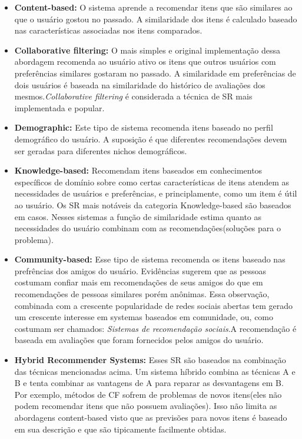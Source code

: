 \begin{itemize}
  \item \textbf{Content-based:} O sistema aprende a recomendar itens que são similares ao que o usuário gostou no passado. A similaridade dos itens é calculado baseado nas características associadas nos itens comparados.
  \item \textbf{Collaborative filtering:} O mais simples e original implementação dessa abordagem recomenda ao usuário ativo os itens que outros usuários com preferências similares gostaram no passado. A similaridade em preferências de dois usuários é baseada na similaridade do histórico de avaliações dos mesmos.\emph{Collaborative filtering} é considerada a técnica de SR mais implementada e popular.
  \item \textbf{Demographic:} Este tipo de sistema recomenda itens baseado no perfil demográfico do usuário. A suposição é que diferentes recomendações devem ser geradas para diferentes nichos demográficos.
  \item \textbf{Knowledge-based:} Recomendam itens baseados em conhecimentos específicos de domínio sobre como certas características de itens atendem as necessidades de usuários e preferências, e principlamente, como um item é útil ao usuário. Os SR mais notáveis da categoria Knowledge-based são baseados em casos. Nesses sistemas a função de similaridade estima quanto as necessidades do usuário combinam com as recomendações(soluções para o problema).
  \item \textbf{Community-based:} Esse tipo de sistema recomenda os itens baseado nas prefrências dos amigos do usuário. Evidências sugerem que as pessoas costumam confiar mais em recomendações de seus amigos do que em recomendações de pessoas similares porém anônimas. Essa observação, combinada com a crescente popularidade de redes sociais abertas tem gerado um crescente interesse em systemas baseados em comunidade, ou, como costumam ser chamados: \emph{Sistemas de recomendação sociais}.A recomendação é baseada em avaliações que foram fornecidos pelos amigos do usuário.
  \item \textbf{Hybrid Recommender Systems:} Esses SR são baseados na combinação das técnicas mencionadas acima. Um sistema híbrido combina as técnicas A e B e tenta combinar as vantagens de A para reparar as desvantagens em B. Por exemplo, métodos de CF sofrem de problemas de novos itens(eles não podem recomendar itens que não possuem avaliações). Isso não limita as abordagens content-based visto que as previsões para novos itens é baseado em sua descrição e que são tipicamente facilmente obtidas.
\end{itemize}

